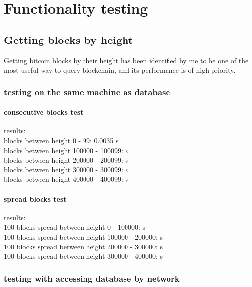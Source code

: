 \documentclass[12pt, en, eng]{mgr}
\begin{document}
\section{Functionality testing}

\subsection{Getting blocks by height}
Getting bitcoin blocks by their height has been identified by me to be one of the most useful way to query blockchain, and its performance is of high priority.
 
\subsubsection{testing on the same machine as database} 

\paragraph{consecutive blocks test}
results:
\\
blocks between height 0 - 99: \quad \quad \quad \hspace*{2em} 0.0035 s\\
blocks between height 100000 - 100099:  s\\
blocks between height 200000 - 200099:  s\\
blocks between height 300000 - 300099:  s\\
blocks between height 400000 - 400099:  s\\

\paragraph{spread blocks test}
results:
\\
100 blocks spread between height 0 - 100000: \quad \quad {} s\\
100 blocks spread between height 100000 - 200000:  s\\
100 blocks spread between height 200000 - 300000:  s\\
100 blocks spread between height 300000 - 400000:  s\\

\subsubsection{testing with accessing database by network}
\end{document}
